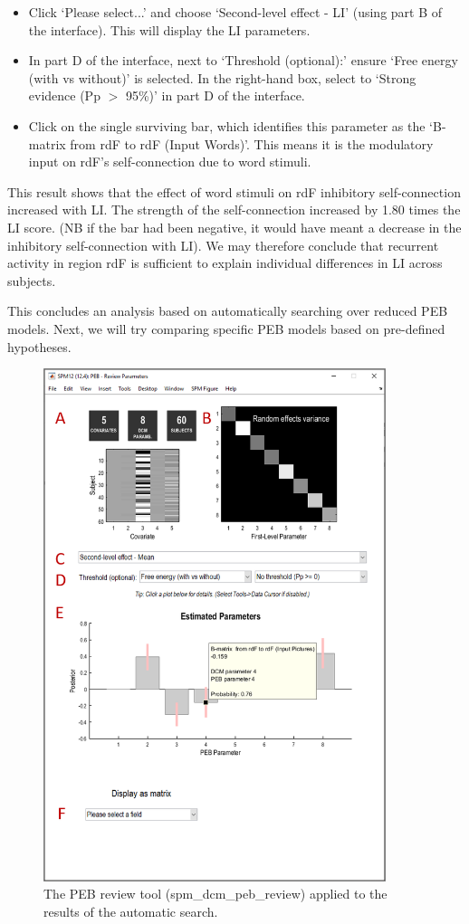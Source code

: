 \documentclass{article}
\begin{document}
\begin{itemize}
    \item Click `Please select...' and choose `Second-level effect - LI' (using part B of the interface). This will display the LI parameters.
    \item In part D of the interface, next to `Threshold (optional):' ensure `Free energy (with vs without)' is selected. In the right-hand box, select to `Strong evidence (Pp $>$ 95\%)' in part D of the interface.
    \item Click on the single surviving bar, which identifies this parameter as the `B-matrix from rdF to rdF (Input Words)'. This means it is the modulatory input on rdF's self-connection due to word stimuli.
\end{itemize}

This result shows that the effect of word stimuli on rdF inhibitory self-connection increased with LI. The strength of the self-connection increased by 1.80 times the LI score. (NB if the bar had been negative, it would have meant a decrease in the inhibitory self-connection with LI). We may therefore conclude that recurrent activity in region rdF is sufficient to explain individual differences in LI across subjects.

This concludes an analysis based on automatically searching over reduced PEB models. Next, we will try comparing specific PEB models based on pre-defined hypotheses.

\begin{figure}[ht]
\begin{center}
\includegraphics[width=10cm]{"Fig_peb_search_review"}
\caption{The PEB review tool (spm\_dcm\_peb\_review) applied to the results of the automatic search.\label{Fig_peb_search_review}}
\end{center}
\end{figure}
\end{document}
